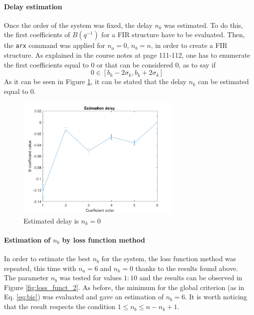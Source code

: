 \documentclass[a4paper,11pt]{article}
\begin{document}
\paragraph{Delay estimation}
Once the order of the system was fixed, the delay $n_k$ was estimated. To do this, the first coefficients of $B(q^{-1})$ for a FIR structure have to be evaluated. Then, the \texttt{arx} command was applied for $n_a = 0$, $n_b = n$, in order to create a FIR structure. As explained in the course notes at page 111-112, one has to enumerate the first coefficients equal to 0 or that can be considered 0, as to say if 
\begin{equation}
0 \in [b_k - 2\sigma_k, b_k + 2\sigma_k]
\end{equation}
As it can be seen in Figure \ref{fig:est_delay}, it can be stated that the delay $n_k$ can be estimated equal to 0.

\begin{figure}[H]
\centering
\includegraphics[width = 8cm]{images/1_est_delay_order}
\caption{Estimated delay is $n_k = 0$}
\label{fig:est_delay}
\end{figure}

\paragraph{Estimation of $n_b$ by loss function method}
In order to estimate the best $n_b$ for the system, the loss function method was repeated, this time with $n_a = 6$ and $n_k = 0$ thanks to the results found above. The parameter $n_b$ was tested for values $1 : 10$ and the results can be observed in Figure \ref{fig:loss_funct_2}. As before, the minimum for the global criterion (as in Eq. \ref{eq:bic}) was evaluated and gave an estimation of $n_b = 6$. It is worth noticing that the result respects the condition $1\leq n_b \leq n-n_k+1$.
\end{document}
